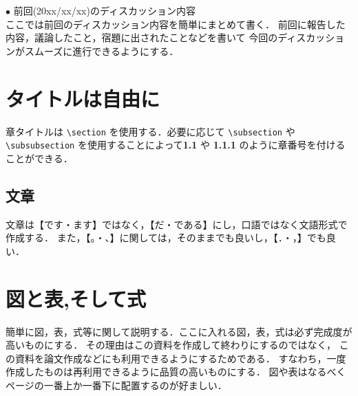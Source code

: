 \documentclass[11pt, a4paper]{jarticle}
\begin{document}
\author{B3 塚 春輝} %
\date{2025/03/11} %

\maketitle %



\noindent
$\bullet$ 前回(20xx/xx/xx)のディスカッション内容\\
ここでは前回のディスカッション内容を簡単にまとめて書く．
前回に報告した内容，議論したこと，宿題に出されたことなどを書いて
今回のディスカッションがスムーズに進行できるようにする\cite{aa}．



\section{タイトルは自由に}
章タイトルは
\verb+\section+
を使用する．必要に応じて
\verb+\subsection+
や 
\verb+\subsubsection+
を使用することによって{\bf 1.1} や {\bf 1.1.1} のように章番号を付けることができる\cite{bb}．



\subsection{文章}
文章は【です・ます】ではなく，【だ・である】にし，口語ではなく文語形式で作成する．
また，【。・、】に関しては，そのままでも良いし，【．・，】でも良い．

\section{図と表,そして式}
簡単に図，表，式等に関して説明する．ここに入れる図，表，式は必ず完成度が高いものにする．
その理由はこの資料を作成して終わりにするのではなく，
この資料を論文作成などにも利用できるようにするためである．
すなわち，一度作成したものは再利用できるように品質の高いものにする．
図や表はなるべくページの一番上か一番下に配置するのが好ましい．
\end{document}
